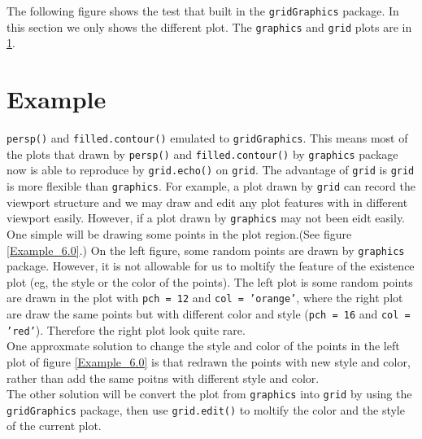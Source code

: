 \documentclass[paper=a4, fontsize=11pt]{report}
\begin{document}
The following figure shows the test that built in the \texttt{gridGraphics} package. In this section we only shows the different plot. The \texttt{graphics} and \texttt{grid} plots are in \ref{}.\\



\chapter{Example}
\texttt{persp()} and \texttt{filled.contour()} emulated to \texttt{gridGraphics}. This means most of the plots that drawn by \texttt{persp()} and \texttt{filled.contour()} by \texttt{graphics} package now is able to reproduce by \texttt{grid.echo()} on \texttt{grid}. The advantage of \texttt{grid} is \texttt{grid} is more flexible than \texttt{graphics}. For example, a plot drawn by \texttt{grid} can record the viewport structure and we may draw and edit any plot features with in different viewport easily. However, if a plot drawn by \texttt{graphics} may not been eidt easily.\\
One simple will be drawing some points in the plot region.(See figure \ref{Example_6.0}.) On the left figure, some random points are drawn by \texttt{graphics} package. However, it is not allowable for us to moltify the feature of the existence plot (eg, the style or the color of the points). The left plot is some random points are drawn in the plot with \texttt{pch = 12} and \texttt{col = 'orange'}, where the right plot are draw the same points but with different color and style (\texttt{pch = 16} and \texttt{col = 'red'}). Therefore the right plot look quite rare.\\

One approxmate solution to change the style and color of the points in the left plot of figure \ref{Example_6.0} is that redrawn the points with new style and color, rather than add the same poitns with different style and color.\\
The other solution will be convert the plot from \texttt{graphics} into \texttt{grid} by using the \texttt{gridGraphics} package, then use \texttt{grid.edit()} to moltify the color and the style of the current plot.\\
\end{document}
